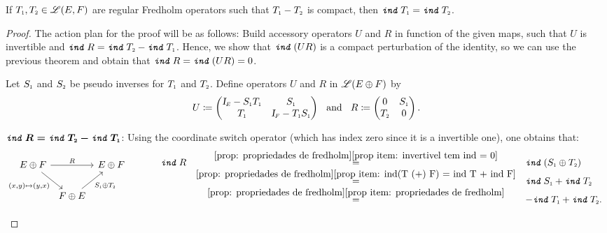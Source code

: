 \begin{teorema}
    \label{teo: diferenca compacta, indices simetricos}
    If $\sub{T}{1}, \sub{T}{2} \in \adj(E, F)$ are regular Fredholm operators such that $\sub{T}{1}-\sub{T}{2}$ is compact, then $\ind \sub{T}{1}=\ind \sub{T}{2}$.
    \begin{proof}
        The action plan for the proof will be as follows: Build accessory operators $U$ and $R$ in function of the given maps, such that $U$ is invertible and $\ind R = \ind \sub{T}{2} - \ind \sub{T}{1}$. Hence, we show that $\texttt{\textit{ind}}\, (UR)$ is a compact perturbation of the identity, so we can use the previous theorem and obtain that $\texttt{\textit{ind}}\, R=\texttt{\textit{ind}}\,(UR)=0$.

        Let $\sub S1$ and $\sub S2$ be pseudo inverses for $\sub{T}{1}$ and $\sub{T}{2}$. Define operators $U$ and $R$ in $\mathscr L(E \oplus F)$ by
        \begin{equation*}
            U\coloneqq \begin{pmatrix}
        \sub \Id E-\sub S1 \sub{T}{1} & \sub S1 \\
        \sub{T}{1} & \sub\Id F-\sub{T}{1} \sub S1
        \end{pmatrix} \e R\coloneqq \begin{pmatrix}
        0 & \sub S1 \\
        \sub{T}{2} & 0
        \end{pmatrix}.
        \end{equation*}
        \begin{itroman}
        \item $\boldsymbol{\ind R = \ind \sub{T}{2} - \ind \sub{T}{1}}$: Using the coordinate switch operator (which has index zero since it is a invertible one), one obtains that:  
        \begin{equation*}
        \begin{tikzcd}[column sep=0.15cm]
        E\oplus F \arrow[rr, "R"] \arrow[rd, "{(x,y) \mapsto (y,x)}"'] &           & E \oplus F \\
        & F \oplus E \arrow[ru, "\sub S1 \oplus \sub{T}{2}"'] &
        \end{tikzcd}
        \hspace{1cm} 
        \begin{array}{rcl}
            \ind R &\overset{\ref{prop: propriedades de fredholm}\ref{prop item: invertivel tem ind = 0}}=& \ind(\sub S1 \oplus \sub{T}{2}) \\
            &\overset{\ref{prop: propriedades de fredholm}\ref{prop item: ind(T (+) F) = ind T + ind F}}=& \ind \sub S1 + \ind \sub{T}{2} \\
            &\overset{\ref{prop: propriedades de fredholm}\ref{prop item: propriedades de fredholm}}=& - \ind \sub{T}{1}+ \ind \sub{T}{2}.
        \end{array}
        \end{equation*}


\end{itroman}
\end{proof}
\end{teorema}
